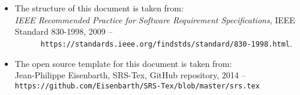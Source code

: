 
\begin{itemize}
   \item The structure of this document is taken from: \\
      \textit{IEEE Recommended Practice for Software Requirement
      Specifications}, IEEE Standard 830-1998, 2009 -- \nolinkurl{
      https://standards.ieee.org/findstds/standard/830-1998.html}.
   \item The open source template for this document is taken from: \\
      Jean-Philippe Eisenbarth, SRS-Tex, GitHub repository, 2014 -- 
      \nolinkurl{https://github.com/Eisenbarth/SRS-Tex/blob/master/srs.tex}
\end{itemize}
